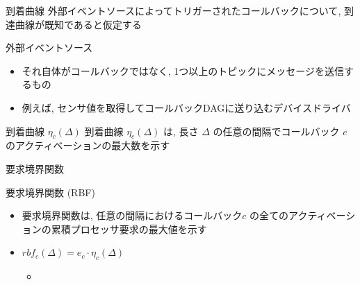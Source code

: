 \begin{frame}{到着曲線}
    外部イベントソースによってトリガーされたコールバックについて, 到達曲線が既知であると仮定する
    \begin{block}{外部イベントソース}
        \setlength{\linewidth}{0.98\columnwidth}
        \begin{itemize}
            \item それ自体がコールバックではなく, 1つ以上のトピックにメッセージを送信するもの
            \item 例えば, センサ値を取得してコールバックDAGに送り込むデバイスドライバ
        \end{itemize}
    \end{block}
    \begin{block}{到着曲線 $\eta_{c}(\Delta)$}
        到着曲線 $\eta_{c}(\Delta)$ は, 長さ $\Delta$ の任意の間隔でコールバック $c$ のアクティベーションの最大数を示す
    \end{block}
\end{frame}

\begin{frame}{要求境界関数}
    \begin{block}{要求境界関数 (RBF)}
        \setlength{\linewidth}{0.98\columnwidth}
        \begin{itemize}
            \item 要求境界関数は, 任意の間隔におけるコールバック$c$ の全てのアクティベーションの累積プロセッサ要求の最大値を示す
            \item $r b f_{c}(\Delta)=e_{c} \cdot \eta_{c}(\Delta)$
                  \begin{itemize}
                      \item {}
                  \end{itemize}
        \end{itemize}
    \end{block}
\end{frame}
